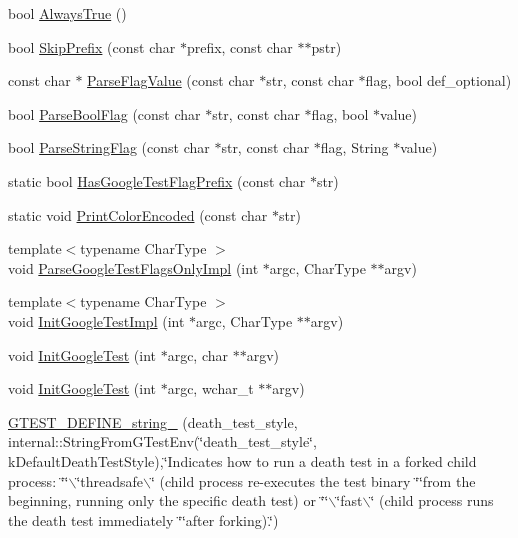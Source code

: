 \begin{DoxyCompactItemize}
\item 
bool \hyperlink{namespacetesting_1_1internal_a7b125f3952e08530aedb98a650ee73c1}{\-Always\-True} ()
\item 
bool \hyperlink{namespacetesting_1_1internal_ac490e9b0963689436d4c483653b3f93f}{\-Skip\-Prefix} (const char $\ast$prefix, const char $\ast$$\ast$pstr)
\item 
const char $\ast$ \hyperlink{namespacetesting_1_1internal_a5e4e5aab56cf1d77b5bf092c875142ef}{\-Parse\-Flag\-Value} (const char $\ast$str, const char $\ast$flag, bool def\-\_\-optional)
\item 
bool \hyperlink{namespacetesting_1_1internal_a777a3b389d36aa43396bab9e42286d0e}{\-Parse\-Bool\-Flag} (const char $\ast$str, const char $\ast$flag, bool $\ast$value)
\item 
bool \hyperlink{namespacetesting_1_1internal_ac43d360c9021a4fd0bd939f7c99e61a0}{\-Parse\-String\-Flag} (const char $\ast$str, const char $\ast$flag, \-String $\ast$value)
\item 
static bool \hyperlink{namespacetesting_1_1internal_aa90ded545c69ff0535f9f6a70ab45612}{\-Has\-Google\-Test\-Flag\-Prefix} (const char $\ast$str)
\item 
static void \hyperlink{namespacetesting_1_1internal_ad448973e8494343c56ae947eb38f21a7}{\-Print\-Color\-Encoded} (const char $\ast$str)
\item 
{\footnotesize template$<$typename Char\-Type $>$ }\\void \hyperlink{namespacetesting_1_1internal_ad2d2daedebbf18eb13fb9deb1f069f6e}{\-Parse\-Google\-Test\-Flags\-Only\-Impl} (int $\ast$argc, \-Char\-Type $\ast$$\ast$argv)
\item 
{\footnotesize template$<$typename Char\-Type $>$ }\\void \hyperlink{namespacetesting_1_1internal_aa955365c835d1a8f1659369249b5b1e4}{\-Init\-Google\-Test\-Impl} (int $\ast$argc, \-Char\-Type $\ast$$\ast$argv)
\item 
void \hyperlink{namespacetesting_a2ba4fda7f4d403cbcdf289327009a2da}{\-Init\-Google\-Test} (int $\ast$argc, char $\ast$$\ast$argv)
\item 
void \hyperlink{namespacetesting_a971fc7a1a79f211cb0b830dd28e9dd41}{\-Init\-Google\-Test} (int $\ast$argc, wchar\-\_\-t $\ast$$\ast$argv)
\item 
\hyperlink{namespacetesting_aa36974bb83a6d932b9163c94630b7135}{\-G\-T\-E\-S\-T\-\_\-\-D\-E\-F\-I\-N\-E\-\_\-string\-\_\-} (death\-\_\-test\-\_\-style, internal\-::\-String\-From\-G\-Test\-Env(\char`\"{}death\-\_\-test\-\_\-style\char`\"{}, k\-Default\-Death\-Test\-Style),\char`\"{}\-Indicates how to run a death test in a forked child process\-: \char`\"{}\char`\"{}$\backslash$\char`\"{}threadsafe$\backslash$\char`\"{} (child process re-\/executes the test binary \char`\"{}\char`\"{}from the beginning, running only the specific death test) or \char`\"{}\char`\"{}$\backslash$\char`\"{}fast$\backslash$\char`\"{} (child process runs the death test immediately \char`\"{}\char`\"{}after forking).\char`\"{})
$$
\end{DoxyCompactItemize}
